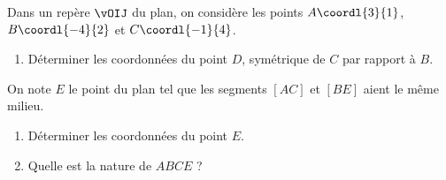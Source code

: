 \begin{exo}{}
	Dans un repère $\vOIJ$ du plan, on considère les points $A\coordl{3}{1}$, $B\coordl{-4}{2}$ et $C\coordl{-1}{4}$.

	\begin{enumerate}
		\item Déterminer les coordonnées du point $D$, symétrique de $C$ par rapport à $B$.
	\end{enumerate}
	On note $E$ le point du plan tel que les segments $[AC]$ et $[BE]$ aient le même milieu.
	\begin{enumerate}[resume]
		\item Déterminer les coordonnées du point $E$.
		\item Quelle est la nature de $ABCE$ ?
	\end{enumerate}
\end{exo}

